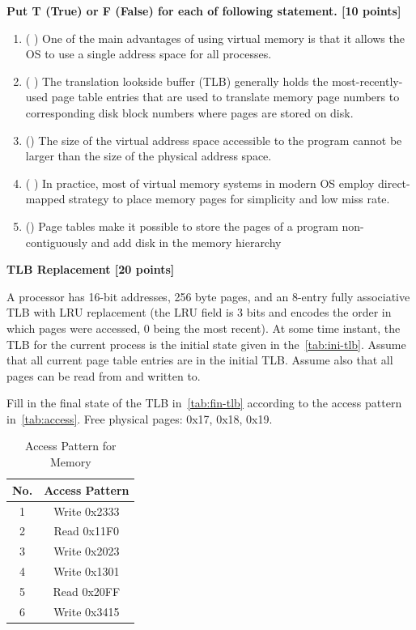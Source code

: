 \documentclass[addpoints, 12pt, answers]{exam}
\begin{document}
\begin{questions}

\question[10] \textbf{Put T (True) or F (False) for each of following statement. [10 points]}

\begin{enumerate}[(1)]
    \item ( \quad ) One of the main advantages of using virtual memory is that it allows the OS to use a single address space for all processes. 
    \item ( \quad  ) The translation lookside buffer (TLB) generally holds the most-recently-used page table entries that are used to translate memory page numbers to corresponding disk block numbers where pages are stored on disk.
    \item (\quad) The size of the virtual address space accessible to the program cannot be larger than the size of the physical address space.
    \item ( \quad  )  In practice, most of virtual memory systems in modern OS employ direct-mapped strategy to place memory pages for simplicity and low miss rate.
    \item (\quad) Page tables make it possible to store the pages of a program non-contiguously and add disk in the memory hierarchy
\end{enumerate}

\pagebreak
\question[20] \textbf{TLB Replacement [20 points]}

A processor has 16-bit addresses, 256 byte pages, 
and an 8-entry fully associative TLB with LRU replacement 
(the LRU field is 3 bits and encodes the order in which pages were accessed, 
0 being the most recent). 
At some time instant, 
the TLB for the current process is the initial state given in the~\autoref{tab:ini-tlb}. 
Assume that all current page table entries are in the initial TLB. 
Assume also that all pages can be read from and written to. 

Fill in the final state of the TLB in~\autoref{tab:fin-tlb} according to the access pattern in~\autoref{tab:access}. 
Free physical pages: 0x17, 0x18, 0x19.

\begin{table}[H]
	\centering
	\caption{Access Pattern for Memory}
	\label{tab:access}
	\begin{tabular}{|c|c|}
	\hline
	No. & Access Pattern \\ \hline
	1   & Write 0x2333   \\ \hline
	2   & Read 0x11F0    \\ \hline
	3   & Write 0x2023   \\ \hline
	4   & Write 0x1301   \\ \hline
	5   & Read 0x20FF    \\ \hline
	6   & Write 0x3415    \\ \hline
	\end{tabular}
\end{table}



\end{questions}
\end{document}
